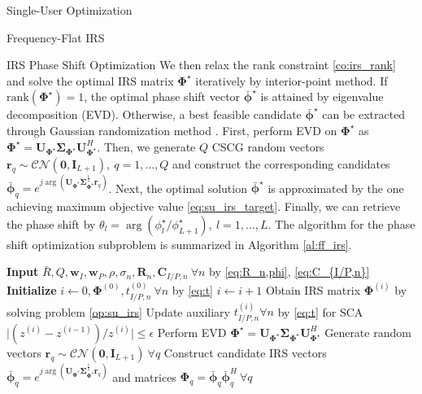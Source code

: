 \documentclass{IEEEtran}
\begin{document}
\begin{section}{Single-User Optimization}
\begin{subsection}{Frequency-Flat IRS}
\begin{subsubsection}{IRS Phase Shift Optimization}
			We then relax the rank constraint \ref{co:irs_rank} and solve the optimal IRS matrix $\boldsymbol{\Phi}^{\star}$ iteratively by interior-point method. If $\mathrm{rank}(\boldsymbol{\Phi}^{\star})=1$, the optimal phase shift vector $\bar{\boldsymbol{\phi}}^\star$ is attained by eigenvalue decomposition (EVD). Otherwise, a best feasible candidate $\bar{\boldsymbol{\phi}}^\star$ can be extracted through Gaussian randomization method \cite{Huang2010}. First, perform EVD on $\boldsymbol{\Phi}^{\star}$ as $\boldsymbol{\Phi}^{\star}=\boldsymbol{U}_{\boldsymbol{\Phi}^{\star}}\boldsymbol{\Sigma}_{\boldsymbol{\Phi}^{\star}}\boldsymbol{U}_{\boldsymbol{\Phi}^{\star}}^H$. Then, we generate $Q$ CSCG random vectors $\boldsymbol{r}_q \sim \mathcal{CN}(\boldsymbol{0},\boldsymbol{I}_{L+1}),\ q=1,\dots,Q$ and construct the corresponding candidates $\bar{\boldsymbol{\phi}}_q=e^{j\arg\left(\boldsymbol{U}_{\boldsymbol{\Phi}^{\star}}\boldsymbol{\Sigma}_{\boldsymbol{\Phi}^{\star}}^{\frac{1}{2}}\boldsymbol{r}_q\right)}$. Next, the optimal solution $\bar{\boldsymbol{\phi}}^\star$ is approximated by the one achieving maximum objective value \ref{eq:su_irs_target}. Finally, we can retrieve the phase shift by $\theta_l=\arg(\phi_l^\star/\phi_{L+1}^\star), \ l=1,\dots,L$. The algorithm for the phase shift optimization subproblem is summarized in Algorithm \ref{al:ff_irs}.
			\begin{algorithm}
				\caption{FF-IRS: IRS Phase Shift}
				\label{al:ff_irs}
				\begin{algorithmic}[1]
					\State \textbf{Input} $\bar{R},Q,\boldsymbol{w}_I,\boldsymbol{w}_P,\rho,\sigma_n,\boldsymbol{R}_n,\boldsymbol{C}_{I/P,n} \ \forall n$ by \ref{eq:R_n,phi}, \ref{eq:C_{I/P,n}}
					\State \textbf{Initialize} $i \leftarrow 0,\boldsymbol{\Phi}^{(0)},t_{I/P,n}^{(0)}\ \forall n$ by \ref{eq:t}
					\Repeat
					\State $i \leftarrow i + 1$
					\State Obtain IRS matrix $\boldsymbol{\Phi}^{(i)}$ by solving problem \ref{op:su_irs}
					\State Update auxiliary $t_{I/P,n}^{(i)} \forall n$ by \ref{eq:t} for SCA
					\Until $\lvert (z^{(i)}-z^{(i-1)}) / z^{(i)} \rvert \le \epsilon$
					\State Perform EVD $\boldsymbol{\Phi}^{\star}=\boldsymbol{U}_{\boldsymbol{\Phi}^{\star}}\boldsymbol{\Sigma}_{\boldsymbol{\Phi}^{\star}}\boldsymbol{U}_{\boldsymbol{\Phi}^{\star}}^H$
					\State Generate random vectors $\boldsymbol{r}_q \sim \mathcal{CN}(\boldsymbol{0},\boldsymbol{I}_{L+1}) \ \forall q$
					\State Construct candidate IRS vectors $\bar{\boldsymbol{\phi}}_q=e^{j\arg\left(\boldsymbol{U}_{\boldsymbol{\Phi}^{\star}}\boldsymbol{\Sigma}_{\boldsymbol{\Phi}^{\star}}^{\frac{1}{2}}\boldsymbol{r}_q\right)}$ and matrices $\boldsymbol{\Phi}_q=\bar{\boldsymbol{\phi}}_q\bar{\boldsymbol{\phi}}_q^H  \ \forall q$

\end{algorithmic}
\end{algorithm}
\end{subsubsection}
\end{subsection}
\end{section}
\end{document}
